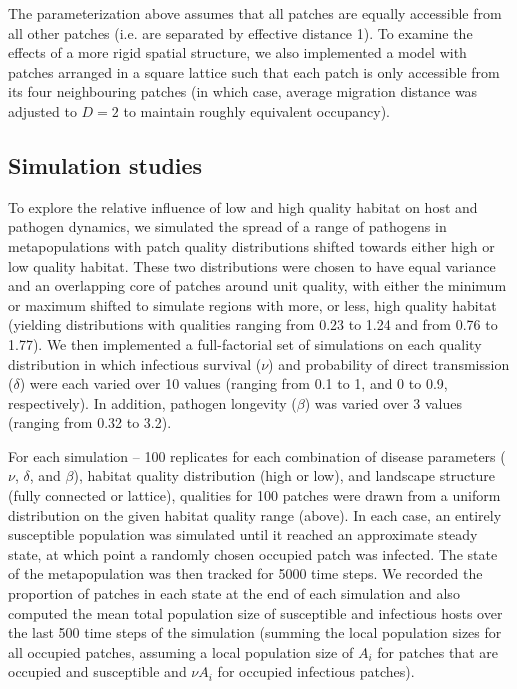 \documentclass{article}
\begin{document}
The parameterization above assumes that all patches are equally accessible from all other patches (i.e. are separated by effective distance 1).  To examine the effects of a more rigid spatial structure, we also implemented a model with patches arranged in a square lattice such that each patch is only accessible from its four neighbouring patches (in which case, average migration distance was adjusted to $D = 2$ to maintain roughly equivalent occupancy).  

\subsection{Simulation studies}

To explore the relative influence of low and high quality habitat on host and pathogen dynamics, we simulated the spread of a range of pathogens in metapopulations with patch quality distributions shifted towards either high or low quality habitat.
These two distributions were chosen to have equal variance and an overlapping core of patches around unit quality, with either the minimum or maximum shifted to simulate regions with more, or less, high quality habitat (yielding distributions with qualities ranging from 0.23 to 1.24 and from 0.76 to 1.77).  
We then implemented a full-factorial set of simulations on each quality distribution in which infectious survival ($\nu$) and probability of direct transmission ($\delta$) were each varied over 10 values (ranging from 0.1 to 1, and 0 to 0.9, respectively).  In addition, pathogen longevity ($\beta$) was varied over 3 values (ranging from 0.32 to 3.2).

For each simulation -- 100 replicates for each combination of disease parameters ($\nu$, $\delta$, and $\beta$), habitat quality distribution (high or low), and landscape structure (fully connected or lattice), qualities for 100 patches were drawn from a uniform distribution on the given habitat quality range (above). In each case, an entirely susceptible population was simulated until it reached an approximate steady state, at which point a randomly chosen occupied patch was infected.  The state of the metapopulation was then tracked for 5000 time steps.  We recorded the proportion of patches in each state at the end of each simulation and also computed the mean total population size of susceptible and infectious hosts over the last 500 time steps of the simulation (summing the local population sizes for all occupied patches, assuming a local population size of $A_i$ for patches that are occupied and susceptible and $\nu A_i$ for occupied infectious patches).    
\end{document}
